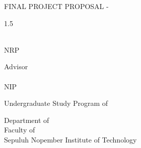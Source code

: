 \begin{large}
  FINAL PROJECT PROPOSAL - \coursecode{}
\end{large}

\vspace{\fill}

\begin{spacing}{1.5}
  \begin{Large}
    \engtatitle{}
  \end{Large}
\end{spacing}

\vspace{\fill}

\begin{large}
  \name{} \\
  \textmd{NRP \nrp{}}
\end{large}

\vspace{\fill}

\begin{large}
  \textmd{Advisor} \\
  \advisor{} \\
  \textmd{NIP \advisornip{}} \\
\end{large}

\vspace{\fill}

Undergraduate Study Program of \engstudyprogram{} \\

\mdseries

Department of \engdepartment{} \\
Faculty of \engfaculty{} \\
Sepuluh Nopember Institute of Technology

\place{} \\ \the\year{}
